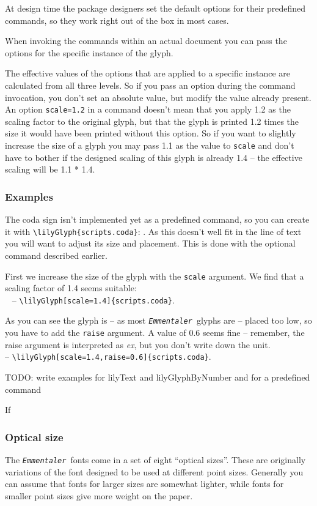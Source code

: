 \documentclass{article}
\newcommand*{\emmentaler}{\texttt{\textit{Emmentaler }}}
\newcommand*{\cmd}[1]{\texttt{\textbackslash #1}}
\begin{document}
At design time the package designers set the default options for their predefined commands, so they work right out of the box in most cases.

When invoking the commands within an actual document you can pass the options for the specific instance of the glyph.

The effective values of the options that are applied to a specific instance are calculated from all three levels. 
So if you pass an option during the command invocation, you don't set an absolute value, but modify the value already present. 
An option \texttt{scale=1.2} in a command doesn't mean that you apply 1.2 as the scaling factor to the original glyph, but that the glyph is printed 1.2 times the size it would have been printed without this option.
So if you want to slightly increase the size of a glyph you may pass 1.1 as the value to \texttt{scale} and don't have to bother if the designed scaling of this glyph is already 1.4 -- the effective scaling will be 1.1 * 1.4.

\subsubsection{Examples}
The coda sign isn't implemented yet as a predefined command, so you can create it with \cmd{lilyGlyph\{scripts.coda\}}: . 
As this doesn't well fit in the line of text you will want to adjust its size and placement.
This is done with the optional command described earlier.

First we increase the size of the glyph with the \texttt{scale} argument. We find that a scaling factor of 1.4 seems suitable:\\
~ -- \cmd{lilyGlyph[scale=1.4]\{scripts.coda\}}.

As you can see the glyph is -- as most \emmentaler glyphs are -- placed too low, so you have to add the \texttt{raise} argument. A value of 0.6 seems fine -- remember, the raise argument is interpreted as \emph{ex}, but you don't write down the unit.\\
 -- \cmd{lilyGlyph[scale=1.4,raise=0.6]\{scripts.coda\}}.

{
\color{red}

\noindent TODO: write examples for lilyText and lilyGlyphByNumber and for a predefined command
}

\bigskip
If

\subsubsection{Optical size}\label{subsubsec:optical_size}
The \emmentaler fonts come in a set of eight \enquote{optical sizes}.
These are originally variations of the font designed to be used at different point sizes.
Generally you can assume that fonts for larger sizes are somewhat lighter, while fonts for smaller point sizes give more weight on the paper.
\end{document}
